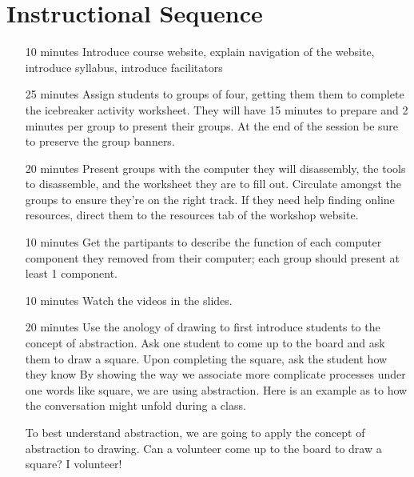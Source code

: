 \documentclass[12pt]{article}
\begin{document}
  \section*{Instructional Sequence}
  \begin{itemize}
    \item[10 minutes] Introduce course website, explain navigation of the
      website, introduce syllabus, introduce facilitators
    \item[25 minutes] Assign students to groups of four, getting them them to complete the icebreaker activity worksheet. They will have 15 minutes to prepare and 2
      minutes per group to present their groups. At the end of the session be
      sure to preserve the group banners.
    \item[20 minutes] Present groups with the computer they will disassembly,
      the tools to disassemble, and the worksheet they are to fill out.
      Circulate amongst the groups to ensure they're on the right track. If
      they need help finding online resources, direct them to the resources tab of the
      workshop website. 
    \item[10 minutes] Get the partipants to describe the function of each
      computer component they removed from their computer; each group should
      present at least 1 component.
    \item[10 minutes] Watch the videos in the slides.
    \item[20 minutes] Use the anology of drawing to first introduce students to
      the concept of abstraction. Ask one student to come up to the board and ask them to
      draw a square. Upon completing the square, ask the student how they know
      By showing the way we associate more complicate processes under one words
      like square, we are using abstraction. Here is an example as to how the
      conversation might unfold during a class.
      \begin{dialogue}
         To best understand abstraction, we are going to
        apply the concept of abstraction to drawing. Can a volunteer come up to
        the board to draw a square?
         I volunteer!



\end{dialogue}
\end{itemize}
\end{document}
